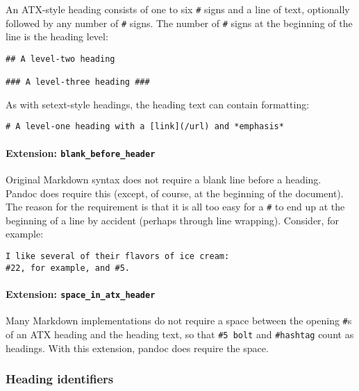 \documentclass[
  a4paper,
]{article}
\begin{document}
An ATX-style heading consists of one to six \texttt{\#} signs and a line
of text, optionally followed by any number of \texttt{\#} signs. The
number of \texttt{\#} signs at the beginning of the line is the heading
level:

\begin{verbatim}
## A level-two heading

### A level-three heading ###
\end{verbatim}

As with setext-style headings, the heading text can contain formatting:

\begin{verbatim}
# A level-one heading with a [link](/url) and *emphasis*
\end{verbatim}

\hypertarget{extension-blank_before_header}{%
\paragraph{\texorpdfstring{Extension:
\texttt{blank\_before\_header}}{Extension: blank\_before\_header}}\label{extension-blank_before_header}}

Original Markdown syntax does not require a blank line before a heading.
Pandoc does require this (except, of course, at the beginning of the
document). The reason for the requirement is that it is all too easy for
a \texttt{\#} to end up at the beginning of a line by accident (perhaps
through line wrapping). Consider, for example:

\begin{verbatim}
I like several of their flavors of ice cream:
#22, for example, and #5.
\end{verbatim}

\hypertarget{extension-space_in_atx_header}{%
\paragraph{\texorpdfstring{Extension:
\texttt{space\_in\_atx\_header}}{Extension: space\_in\_atx\_header}}\label{extension-space_in_atx_header}}

Many Markdown implementations do not require a space between the opening
\texttt{\#}s of an ATX heading and the heading text, so that
\texttt{\#5\ bolt} and \texttt{\#hashtag} count as headings. With this
extension, pandoc does require the space.

\hypertarget{heading-identifiers}{%
\subsubsection{Heading identifiers}\label{heading-identifiers}}
\end{document}
